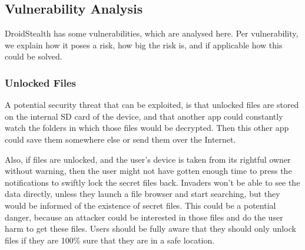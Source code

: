 \subsection{Vulnerability Analysis}
\label{sec:vulnerability-analysis}
DroidStealth has some vulnerabilities, which are analysed here.
Per vulnerability, we explain how it poses a risk, how big the risk is, and if applicable how this could be solved.

\subsubsection{Unlocked Files}
A potential security threat that can be exploited, is that
unlocked files are stored on the internal SD card of the device,
and that another app could constantly watch the folders in which
those files would be decrypted. Then this other app could save
them somewhere else or send them over the Internet.

Also, if files are unlocked, and the user's device is taken from
its rightful owner without warning, then the user might not have
gotten enough time to press the notifications to swiftly lock
the secret files back. Invaders won't be able to see the data
directly, unless they launch a file browser and start searching,
but they would be informed of the existence of secret files.
This could be a potential danger, because an attacker could be
interested in those files and do the user harm to get these
files. Users should be fully aware that they should only unlock
files if they are 100\% sure that they are in a safe location.



